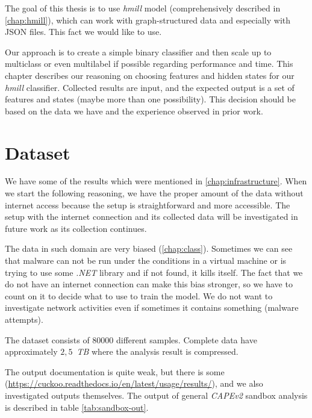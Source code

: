 The goal of this thesis is to use \emph{hmill} model (comprehensively described in \ref{chap:hmill}), which can work with graph-structured data and especially with JSON files. This fact we would like to use.

Our approach is to create a simple binary classifier and then scale up to multiclass or even multilabel if possible regarding performance and time. This chapter describes our reasoning on choosing features and hidden states for our \emph{hmill} classifier.  Collected results are input, and the expected output is a set of features and states (maybe more than one possibility). This decision should be based on the data we have and the experience observed in prior work.


\section{Dataset}
We have some of the results which were mentioned in \ref{chap:infrastructure}. When we start the following reasoning, we have the proper amount of the data without internet access because the setup is straightforward and more accessible. The setup with the internet connection and its collected data will be investigated in future work as its collection continues. 

The data in such domain are very biased (\ref{chap:class}). Sometimes we can see that malware can not be run under the conditions in a virtual machine or is trying to use some \emph{.NET} library and if not found, it kills itself. The fact that we do not have an internet connection can make this bias stronger, so we have to count on it to decide what to use to train the model. We do not want to investigate network activities even if sometimes it contains something (malware attempts).

The dataset consists of $80000$ different samples. Complete data have approximately $2,5$~\emph{TB} where the analysis result is compressed.

The output documentation is quite weak, but there is some (\url{https://cuckoo.readthedocs.io/en/latest/usage/results/}), and we also investigated outputs themselves. The output of general \emph{CAPEv2} sandbox analysis is described in table \ref{tab:sandbox-out}.

